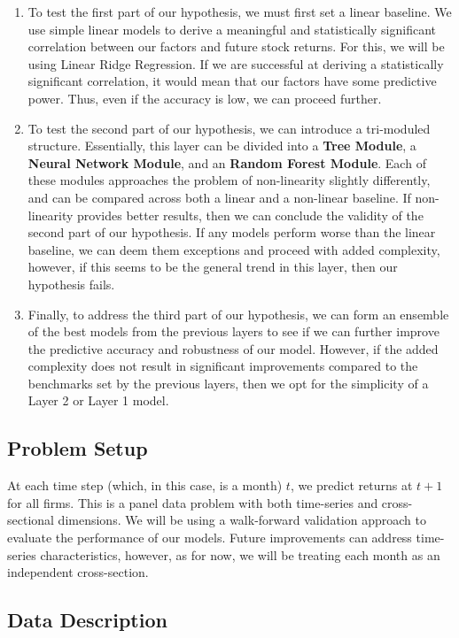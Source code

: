 \documentclass[11pt]{article}
\begin{document}
\begin{enumerate}
    \item To test the first part of our hypothesis, we must first set a linear baseline. We use simple linear models to derive a meaningful and statistically significant correlation between our factors and future stock returns. For this, we will be using Linear Ridge Regression. If we are successful at deriving a statistically significant correlation, it would mean that our factors have some predictive power. Thus, even if the accuracy is low, we can proceed further.
    \item To test the second part of our hypothesis, we can introduce a tri-moduled structure. Essentially, this layer can be divided into a \textbf{Tree Module}, a \textbf{Neural Network Module}, and an \textbf{Random Forest Module}. Each of these modules approaches the problem of non-linearity slightly differently, and can be compared across both a linear and a non-linear baseline. If non-linearity provides better results, then we can conclude the validity of the second part of our hypothesis. If any models perform worse than the linear baseline, we can deem them exceptions and proceed with added complexity, however, if this seems to be the general trend in this layer, then our hypothesis fails.
    \item Finally, to address the third part of our hypothesis, we can form an ensemble of the best models from the previous layers to see if we can further improve the predictive accuracy and robustness of our model. However, if the added complexity does not result in significant improvements compared to the benchmarks set by the previous layers, then we opt for the simplicity of a Layer 2 or Layer 1 model.
\end{enumerate}

\subsection{Problem Setup}
At each time step (which, in this case, is a month) \( t \), we predict returns at \( t+1 \) for all firms. This is a panel data problem with both time-series and cross-sectional dimensions. We will be using a walk-forward validation approach to evaluate the performance of our models. Future improvements can address time-series characteristics, however, as for now, we will be treating each month as an independent cross-section.

\subsection{Data Description}
\end{document}
